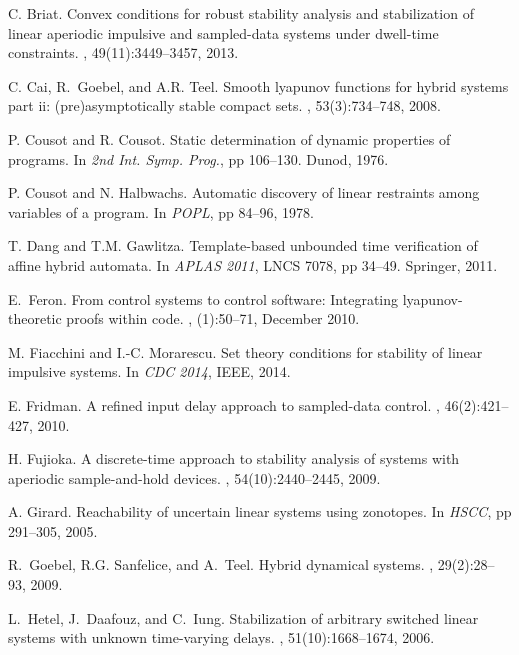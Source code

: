 \begin{thebibliography}{10}
C. Briat.
\newblock Convex conditions for robust stability analysis and stabilization of
  linear aperiodic impulsive and sampled-data systems under dwell-time
  constraints.
, 49(11):3449--3457, 2013.

C. Cai, R.~Goebel, and A.R. Teel.
\newblock Smooth lyapunov functions for hybrid systems part ii:
  (pre)asymptotically stable compact sets.
, 53(3):734--748, 2008.

P. Cousot and R. Cousot.
\newblock Static determination of dynamic properties of programs.
\newblock In {\em 2nd Int. Symp. Prog.}, pp 106--130. Dunod, 1976.

P. Cousot and N. Halbwachs.
\newblock Automatic discovery of linear restraints among variables of a
  program.
\newblock In {\em POPL}, pp 84--96, 1978.

T. Dang and T.M. Gawlitza.
\newblock Template-based unbounded time verification of affine hybrid automata.
\newblock In {\em APLAS 2011}, LNCS 7078, pp 34--49. Springer, 2011.

E.~Feron.
\newblock From control systems to control software: Integrating
  lyapunov-theoretic proofs within code.
, (1):50--71, December 2010.

M. Fiacchini and I.-C. Morarescu.
\newblock Set theory conditions for stability of linear impulsive systems.
\newblock In {\em CDC 2014}, IEEE, 2014.

E. Fridman.
\newblock A refined input delay approach to sampled-data control.
, 46(2):421--427, 2010.

H. Fujioka.
\newblock A discrete-time approach to stability analysis of systems with
  aperiodic sample-and-hold devices.
, 54(10):2440--2445,
  2009.

A. Girard.
\newblock Reachability of uncertain linear systems using zonotopes.
\newblock In {\em HSCC}, pp 291--305, 2005.

R.~Goebel, R.G. Sanfelice, and A.~Teel.
\newblock Hybrid dynamical systems.
, 29(2):28--93, 2009.

L.~Hetel, J.~Daafouz, and C.~Iung.
\newblock Stabilization of arbitrary switched linear systems with unknown
  time-varying delays.
, 51(10):1668--1674,
  2006.


\end{thebibliography}
